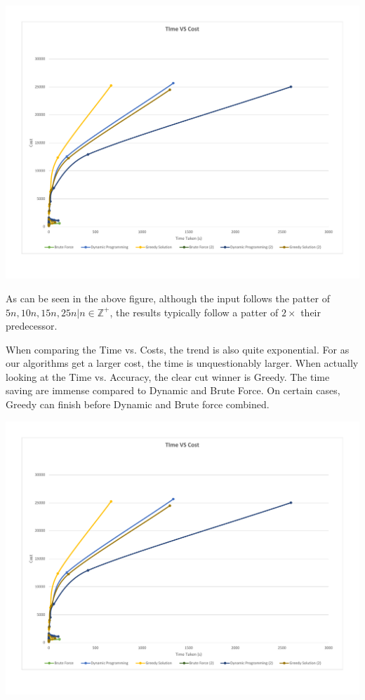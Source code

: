 \documentclass{article}
\begin{document}
\begin{adjustwidth}{-1.55cm}{}
    \centering
    \includegraphics[page=2,width=1.25\textwidth]{Graphs.pdf}
\end{adjustwidth}

As can be seen in the above figure, although the input follows the patter of $5n, 10n, 15n, 25n | n \in \mathbb{Z}^+$, the results typically follow a patter of $2\times$ their predecessor.

When comparing the Time vs. Costs, the trend is also quite exponential. For as our algorithms get a larger cost, the time is unquestionably larger. When actually looking at the Time vs. Accuracy, the clear cut winner is Greedy. The time saving are immense compared to Dynamic and Brute Force. On certain cases, Greedy can finish before Dynamic and Brute force combined.

\begin{adjustwidth}{-1.55cm}{}
    \centering
    \includegraphics[page=1,width=1.25\textwidth]{Graphs.pdf}
\end{adjustwidth}
\end{document}
